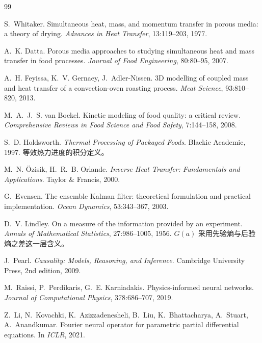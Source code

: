 \begin{thebibliography}{99}
S.~Whitaker.
\newblock Simultaneous heat, mass, and momentum transfer in porous media: a theory of drying.
\newblock \emph{Advances in Heat Transfer}, 13:119--203, 1977.

A.~K. Datta.
\newblock Porous media approaches to studying simultaneous heat and mass transfer in food processes.
\newblock \emph{Journal of Food Engineering}, 80:80--95, 2007.

A.~H. Feyissa, K.~V. Gernaey, J.~Adler-Nissen.
\newblock 3D modelling of coupled mass and heat transfer of a convection-oven roasting process.
\newblock \emph{Meat Science}, 93:810--820, 2013.

M.~A.~J.~S. van Boekel.
\newblock Kinetic modeling of food quality: a critical review.
\newblock \emph{Comprehensive Reviews in Food Science and Food Safety}, 7:144--158, 2008.

S.~D. Holdsworth.
\newblock \emph{Thermal Processing of Packaged Foods}.
\newblock Blackie Academic, 1997.
\newblock 等效热力进度的积分定义。

M.~N. \"Ozisik, H.~R.~B. Orlande.
\newblock \emph{Inverse Heat Transfer: Fundamentals and Applications}.
\newblock Taylor \& Francis, 2000.

G.~Evensen.
\newblock The ensemble Kalman filter: theoretical formulation and practical implementation.
\newblock \emph{Ocean Dynamics}, 53:343--367, 2003.

D.~V. Lindley.
\newblock On a measure of the information provided by an experiment.
\newblock \emph{Annals of Mathematical Statistics}, 27:986--1005, 1956.
\newblock $G(a)$ 采用先验熵与后验熵之差这一层含义。

J.~Pearl.
\newblock \emph{Causality: Models, Reasoning, and Inference}.
\newblock Cambridge University Press, 2nd edition, 2009.

M.~Raissi, P.~Perdikaris, G.~E. Karniadakis.
\newblock Physics-informed neural networks.
\newblock \emph{Journal of Computational Physics}, 378:686--707, 2019.

Z.~Li, N.~Kovachki, K.~Azizzadenesheli, B.~Liu, K.~Bhattacharya, A.~Stuart, A.~Anandkumar.
\newblock Fourier neural operator for parametric partial differential equations.
\newblock In \emph{ICLR}, 2021.


\end{thebibliography}
